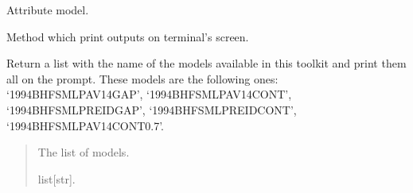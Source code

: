 \documentclass[letterpaper,10pt,english]{sphinxmanual}
\begin{document}
\begin{fulllineitems}
\begin{fulllineitems}
\end{fulllineitems}


\begin{fulllineitems}
\label{\detokenize{source/api/setup_micro_LP:nucleardatapy.setup_micro_LP.SetupMicroLP.model}}
\pysigstartsignatures
\pysigline
{}
\pysigstopsignatures
\sphinxAtStartPar
Attribute model.

\end{fulllineitems}


\begin{fulllineitems}
\label{\detokenize{source/api/setup_micro_LP:nucleardatapy.setup_micro_LP.SetupMicroLP.print_outputs}}
\pysigstartsignatures
\pysiglinewithargsret
{}
{}
{}
\pysigstopsignatures
\sphinxAtStartPar
Method which print outputs on terminal’s screen.

\end{fulllineitems}


\end{fulllineitems}


\begin{fulllineitems}
\label{\detokenize{source/api/setup_micro_LP:nucleardatapy.setup_micro_LP.models_micro_LP}}
\pysigstartsignatures
\pysiglinewithargsret
{}
{}
{}
\pysigstopsignatures
\sphinxAtStartPar
Return a list with the name of the models available in this toolkit and     print them all on the prompt. These models are the following ones:     ‘1994\sphinxhyphen{}BHF\sphinxhyphen{}SM\sphinxhyphen{}LP\sphinxhyphen{}AV14\sphinxhyphen{}GAP’, ‘1994\sphinxhyphen{}BHF\sphinxhyphen{}SM\sphinxhyphen{}LP\sphinxhyphen{}AV14\sphinxhyphen{}CONT’,     ‘1994\sphinxhyphen{}BHF\sphinxhyphen{}SM\sphinxhyphen{}LP\sphinxhyphen{}REID\sphinxhyphen{}GAP’, ‘1994\sphinxhyphen{}BHF\sphinxhyphen{}SM\sphinxhyphen{}LP\sphinxhyphen{}REID\sphinxhyphen{}CONT’, ‘1994\sphinxhyphen{}BHF\sphinxhyphen{}SM\sphinxhyphen{}LP\sphinxhyphen{}AV14\sphinxhyphen{}CONT\sphinxhyphen{}0.7’.
\begin{quote}\begin{description}
\sphinxAtStartPar
The list of models.

\sphinxAtStartPar
list{[}str{]}.

\end{description}\end{quote}

\end{fulllineitems}
\end{document}
